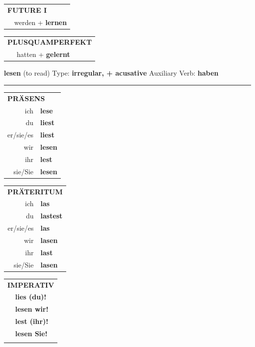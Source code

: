 \documentclass[10pt,a4paper]{revtex4-2}
\begin{document}
\begin{verbbox-acc}
\begin{tabular}{rl}
    \multicolumn{2}{l}{\textbf{FUTURE I} }\\
  &  werden + \textbf{lernen}\\
 
  \end{tabular}
\hfill
   \begin{tabular}{rl}
      \multicolumn{2}{l}{\textbf{PLUSQUAMPERFEKT}}\\
   & hatten + \textbf{gelernt}\\
  \end{tabular}
  
  \vspace{-5pt}


\end{verbbox-acc}
\begin{verbbox-acc}
    {\Large \bf lesen} (to read) \hfill Type: \textbf{irregular, + acusative} \hfill Auxiliary Verb: \textbf{haben} 
    
     \vspace{5pt}

    \hrule
    
    \vspace{5pt}

  \begin{tabular}{rl}
     \multicolumn{2}{l}{\textbf{PRÄSENS} }\\
    ich & \textbf{lese}\\
    du & \textbf{liest}\\
    er/sie/es & \textbf{liest}\\
    wir & \textbf{lesen}\\
    ihr & \textbf{lest}\\
    sie/Sie & \textbf{lesen}\\
  \end{tabular}
  \hfill
     \begin{tabular}{rl}
    \multicolumn{2}{l}{\textbf{PRÄTERITUM} }\\
    ich & \textbf{las}\\
    du & \textbf{lastest}\\
    er/sie/es & \textbf{las}\\
    wir & \textbf{lasen}\\
    ihr & \textbf{last}\\
    sie/Sie & \textbf{lasen}\\
  \end{tabular}
  \hfill
  \begin{tabular}{rl}
     \multicolumn{2}{l}{\textbf{IMPERATIV} }\\
   & \textbf{lies (du)!}\\
   & \textbf{lesen wir!}\\
   & \textbf{lest (ihr)!}\\
   & \textbf{lesen Sie!}\\
   & \vspace{10pt}
  \end{tabular}


\end{verbbox-acc}
\end{document}
